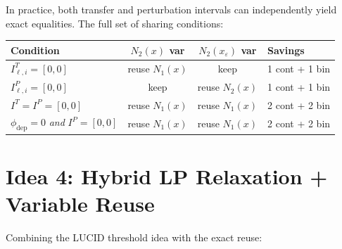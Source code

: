 \documentclass[11pt]{article}
\newcommand{\layerl}{\ell}
\begin{document}
In practice, both transfer and perturbation intervals can independently yield
exact equalities. The full set of sharing conditions:

\begin{center}
\renewcommand{\arraystretch}{1.4}
\begin{tabular}{l|c|c|l}
\textbf{Condition} & \textbf{$N_2(x)$ var} & \textbf{$N_2(x_\varepsilon)$ var} & \textbf{Savings} \\
\hline
$I^T_{\layerl,i} = [0,0]$ & reuse $N_1(x)$ & keep & 1 cont + 1 bin \\
$I^P_{\layerl,i} = [0,0]$ & keep & reuse $N_2(x)$ & 1 cont + 1 bin \\
$I^T = I^P = [0,0]$        & reuse $N_1(x)$ & reuse $N_1(x)$ & 2 cont + 2 bin \\
$\phi_{\text{dep}} = 0$ \emph{and} $I^P = [0,0]$ & reuse $N_1(x)$ & reuse $N_1(x)$ & 2 cont + 2 bin \\
\end{tabular}
\end{center}


\section{Idea 4: Hybrid LP Relaxation + Variable Reuse}
\label{sec:hybrid}

Combining the LUCID threshold idea with the exact reuse:
\end{document}
